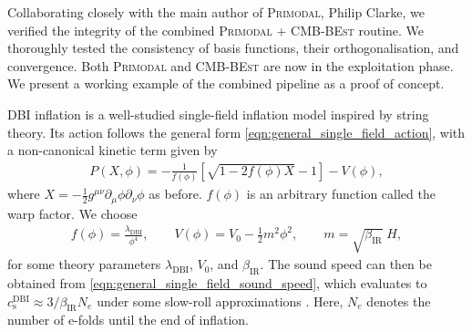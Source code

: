 Collaborating closely with the main author of \textsc{Primodal}, Philip Clarke, we verified the integrity of the combined \textsc{Primodal} + \textsc{CMB-BEst} routine. We thoroughly tested the consistency of basis functions, their orthogonalisation, and convergence. Both \textsc{Primodal} and \textsc{CMB-BEst} are now in the exploitation phase. We present a working example of the combined pipeline as a proof of concept.

DBI inflation \cite{Silverstein2004dbi,Alishahiha2004dbi,Chen2005runningdbi,Bean2008comparingdbi} is a well-studied single-field inflation model inspired by string theory. Its action follows the general form \eqref{eqn:general_single_field_action}, with a non-canonical kinetic term given by
\begin{align}
	P(X,\phi) = - \frac{1}{f(\phi)} \left[ \sqrt{1 - 2f(\phi)X} - 1 \right] - V(\phi),
\end{align}
where $X=-\frac{1}{2} g^{\mu\nu} \partial_\mu \phi \partial_\nu \phi$ as before. $f(\phi)$ is an arbitrary function called the warp factor. We choose
\begin{align}
	f(\phi) = \frac{\lambda_\text{DBI}}{\phi^4}, \qquad V(\phi) = V_0 - \frac{1}{2}m^2\phi^2, \qquad m = \sqrt{\beta_\text{IR}} \; H,
\end{align}
for some theory parameters $\lambda_\text{DBI}$, $V_0$, and $\beta_\text{IR}$. The sound speed can then be obtained from \eqref{eqn:general_single_field_sound_speed}, which evaluates to $c^\text{DBI}_\text{s} \approx 3/\beta_\text{IR} N_e$ under some slow-roll approximations \cite{Chen2005runningdbi}. Here, $N_e$ denotes the number of e-folds until the end of inflation.

